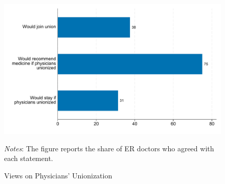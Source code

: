\documentclass[11pt]{article}
\theoremstyle{definition}
\begin{document}
\begin{figure}[H]
	\centering
	\caption{Views on Physicians' Unionization}
	\label{fig:cat_belief}
	\begin{adjustbox}{width=0.85\textwidth}
		\includegraphics{Pre-Survey/figures/sec_stage_byphystype_ER.pdf}
	\end{adjustbox}
	\parbox{.7\linewidth}{
		\vspace{.2cm}
		\scriptsize{\emph{Notes}: The figure reports the share of ER doctors who agreed with each statement.}
	}
\end{figure}
\end{document}
